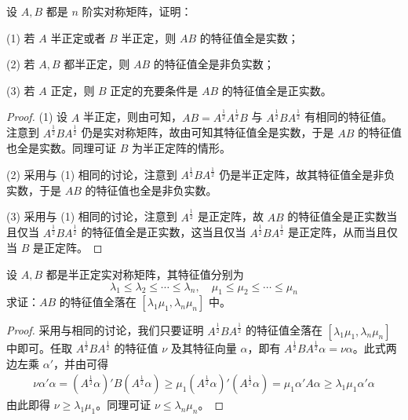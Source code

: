 \documentclass[../../main.tex]{subfiles}%
\begin{document}
\begin{proposition}\label{proposition:例9.64}
设 \(A,B\) 都是 \(n\) 阶实对称矩阵，证明：

(1) 若 \(A\) 半正定或者 \(B\) 半正定，则 \(AB\) 的特征值全是实数；

(2) 若 \(A,B\) 都半正定，则 \(AB\) 的特征值全是非负实数；

(3) 若 \(A\) 正定，则 \(B\) 正定的充要条件是 \(AB\) 的特征值全是正实数。
\end{proposition}
\begin{proof}
(1) 设 \(A\) 半正定，则由可知，\(AB = A^{\frac{1}{2}}A^{\frac{1}{2}}B\) 与 \(A^{\frac{1}{2}}BA^{\frac{1}{2}}\) 有相同的特征值。注意到 \(A^{\frac{1}{2}}BA^{\frac{1}{2}}\) 仍是实对称矩阵，故由可知其特征值全是实数，于是 \(AB\) 的特征值也全是实数。同理可证 \(B\) 为半正定阵的情形。

(2) 采用与 (1) 相同的讨论，注意到 \(A^{\frac{1}{2}}BA^{\frac{1}{2}}\) 仍是半正定阵，故其特征值全是非负实数，于是 \(AB\) 的特征值也全是非负实数。

(3) 采用与 (1) 相同的讨论，注意到 \(A^{\frac{1}{2}}\) 是正定阵，故 \(AB\) 的特征值全是正实数当且仅当 \(A^{\frac{1}{2}}BA^{\frac{1}{2}}\) 的特征值全是正实数，这当且仅当 \(A^{\frac{1}{2}}BA^{\frac{1}{2}}\) 是正定阵，从而当且仅当 \(B\) 是正定阵。 
\end{proof}

\begin{proposition}\label{proposition:例9.65}
设 \(A,B\) 都是半正定实对称矩阵，其特征值分别为
\[
\lambda_1 \leqslant  \lambda_2 \leqslant  \cdots \leqslant  \lambda_n,\quad \mu_1 \leqslant  \mu_2 \leqslant  \cdots \leqslant  \mu_n
\]
求证：\(AB\) 的特征值全落在 \([\lambda_1\mu_1,\lambda_n\mu_n]\) 中。
\end{proposition}
\begin{proof}
采用与相同的讨论，我们只要证明 \(A^{\frac{1}{2}}BA^{\frac{1}{2}}\) 的特征值全落在 \([\lambda_1\mu_1,\lambda_n\mu_n]\) 中即可。任取 \(A^{\frac{1}{2}}BA^{\frac{1}{2}}\) 的特征值 \(\nu\) 及其特征向量 \(\alpha\)，即有 \(A^{\frac{1}{2}}BA^{\frac{1}{2}}\alpha = \nu\alpha\)。此式两边左乘 \(\alpha'\)，并由可得
\begin{align*}
\nu\alpha'\alpha = (A^{\frac{1}{2}}\alpha)'B(A^{\frac{1}{2}}\alpha) \geqslant  \mu_1(A^{\frac{1}{2}}\alpha)'(A^{\frac{1}{2}}\alpha) = \mu_1\alpha'A\alpha \geqslant  \lambda_1\mu_1\alpha'\alpha
\end{align*}
由此即得 \(\nu \geqslant  \lambda_1\mu_1\)。同理可证 \(\nu \leqslant  \lambda_n\mu_n\)。
\end{proof}
\end{document}

